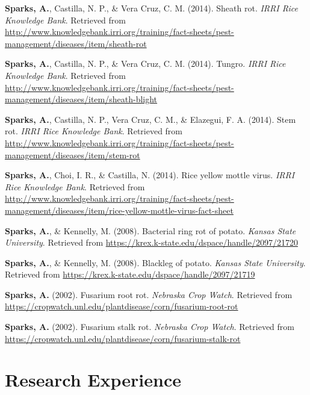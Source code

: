\documentclass[11pt, a4paper]{awesome-cv}
\begin{document}
\leavevmode\hypertarget{ref-Sparks2014g}{}%
\textbf{Sparks, A.}, Castilla, N. P., \& Vera Cruz, C. M. (2014). Sheath rot. \emph{IRRI Rice Knowledge Bank}. Retrieved from \url{http://www.knowledgebank.irri.org/training/fact-sheets/pest-management/diseases/item/sheath-rot}

\leavevmode\hypertarget{ref-Sparks2014d}{}%
\textbf{Sparks, A.}, Castilla, N. P., \& Vera Cruz, C. M. (2014). Tungro. \emph{IRRI Rice Knowledge Bank}. Retrieved from \url{http://www.knowledgebank.irri.org/training/fact-sheets/pest-management/diseases/item/sheath-blight}

\leavevmode\hypertarget{ref-Sparks2014h}{}%
\textbf{Sparks, A.}, Castilla, N. P., Vera Cruz, C. M., \& Elazegui, F. A. (2014). Stem rot. \emph{IRRI Rice Knowledge Bank}. Retrieved from \url{http://www.knowledgebank.irri.org/training/fact-sheets/pest-management/diseases/item/stem-rot}

\leavevmode\hypertarget{ref-Sparks2014i}{}%
\textbf{Sparks, A.}, Choi, I. R., \& Castilla, N. (2014). Rice yellow mottle virus. \emph{IRRI Rice Knowledge Bank}. Retrieved from \url{http://www.knowledgebank.irri.org/training/fact-sheets/pest-management/diseases/item/rice-yellow-mottle-virus-fact-sheet}

\leavevmode\hypertarget{ref-Sparks2008a}{}%
\textbf{Sparks, A.}, \& Kennelly, M. (2008). Bacterial ring rot of potato. \emph{Kansas State University}. Retrieved from \url{https://krex.k-state.edu/dspace/handle/2097/21720}

\leavevmode\hypertarget{ref-Sparks2008b}{}%
\textbf{Sparks, A.}, \& Kennelly, M. (2008). Blackleg of potato. \emph{Kansas State University}. Retrieved from \url{https://krex.k-state.edu/dspace/handle/2097/21719}

\leavevmode\hypertarget{ref-Sparks2002b}{}%
\textbf{Sparks, A.} (2002). Fusarium root rot. \emph{Nebraska Crop Watch}. Retrieved from \url{https://cropwatch.unl.edu/plantdisease/corn/fusarium-root-rot}

\leavevmode\hypertarget{ref-Sparks2002a}{}%
\textbf{Sparks, A.} (2002). Fusarium stalk rot. \emph{Nebraska Crop Watch}. Retrieved from \url{https://cropwatch.unl.edu/plantdisease/corn/fusarium-stalk-rot}

\endgroup

\hypertarget{research-experience}{%
\section{Research Experience}\label{research-experience}}
\end{document}
